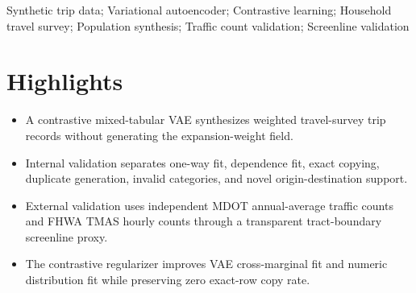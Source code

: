 \documentclass[3p,times,procedia]{elsarticle}
\begin{document}
\begin{frontmatter}
\begin{abstract}
The contrastive VAE embeds categorical trip fields, standardizes numeric fields, and optimizes a weighted reconstruction-plus-KL objective augmented with an InfoNCE representation regularizer. Positive views lightly perturb non-key attributes, while marginal negatives corrupt categorical values and shuffle numeric values. Internal validation compares weighted survey and synthetic one-way marginals, selected two-way cross-marginals, exact-row copying, duplicate rates, invalid-category rates, and novel origin-destination support. External validation uses a two-prong tract-boundary screenline proxy: dense annual-average screenline counts from MDOT SHA AADT/AAWDT stations and sparse hourly counts from FHWA TMAS stations scaled by annual station share. Results show that bootstrap resampling is strongest on internal marginals but copies all records by design. The contrastive VAE has zero exact-row copy rate, produces \num{395542} unique directed origin-destination tract pairs in a one-million-row sample compared with \num{58925} in the survey input, and improves cross-marginal total variation from 0.2556 to 0.2265 relative to the noncontrastive VAE. In external validation, learned generators substantially reduce hourly TMAS RMSE relative to weighted bootstrap; the contrastive VAE has the lowest hourly RMSE, while annual-average screenline totals remain difficult and reveal the limits of current centroid-line assignment. The contribution is therefore not a claim of fully calibrated traffic assignment, but a reproducible synthesis-and-validation framework for judging whether generative trip records preserve marginal, joint, privacy, spatial-support, and independent count-plausibility properties simultaneously.
\end{abstract}

\begin{keyword}
Synthetic trip data; Variational autoencoder; Contrastive learning; Household travel survey; Population synthesis; Traffic count validation; Screenline validation
\end{keyword}

\end{frontmatter}

\section*{Highlights}
\begin{itemize}
    \item A contrastive mixed-tabular VAE synthesizes weighted travel-survey trip records without generating the expansion-weight field.
    \item Internal validation separates one-way fit, dependence fit, exact copying, duplicate generation, invalid categories, and novel origin-destination support.
    \item External validation uses independent MDOT annual-average traffic counts and FHWA TMAS hourly counts through a transparent tract-boundary screenline proxy.
    \item The contrastive regularizer improves VAE cross-marginal fit and numeric distribution fit while preserving zero exact-row copy rate.
\end{itemize}
\end{document}
